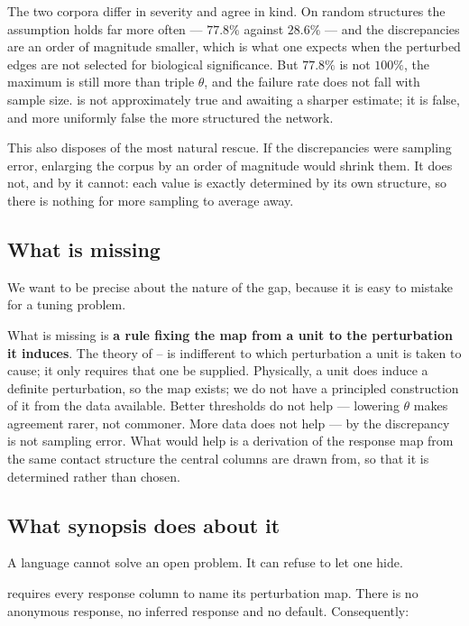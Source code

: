 \documentclass[11pt,twocolumn,a4paper]{article}
\theoremstyle{plain}
\theoremstyle{definition}
\theoremstyle{remark}
\begin{document}
The two corpora differ in severity and agree in kind. On random
structures the assumption holds far more often --- $77.8\%$ against
$28.6\%$ --- and the discrepancies are an order of magnitude smaller,
which is what one expects when the perturbed edges are not selected for
biological significance. But $77.8\%$ is not $100\%$, the maximum is
still more than triple $\theta$, and the failure rate does not fall with
sample size.  is not approximately true and awaiting a
sharper estimate; it is false, and more uniformly false the more
structured the network.

This also disposes of the most natural rescue. If the discrepancies were
sampling error, enlarging the corpus by an order of magnitude would
shrink them. It does not, and by  it cannot: each
value is exactly determined by its own structure, so there is nothing
for more sampling to average away.

\subsection{What is missing}

We want to be precise about the nature of the gap, because it is easy to
mistake for a tuning problem.

What is missing is \textbf{a rule fixing the map from a unit to the
perturbation it induces}. The theory of --
is indifferent to which perturbation a unit is taken to cause; it only
requires that one be supplied. Physically, a unit does induce a
definite perturbation, so the map exists; we do not have a principled
construction of it from the data available. Better thresholds do not
help --- lowering $\theta$ makes agreement rarer, not commoner. More
data does not help --- by  the discrepancy is not
sampling error. What would help is a derivation of the response map from
the same contact structure the central columns are drawn from, so that
it is determined rather than chosen.

\subsection{What synopsis does about it}

A language cannot solve an open problem. It can refuse to let one hide.

 requires every response column to name its
perturbation map. There is no anonymous response, no inferred response
and no default. Consequently:
\end{document}

